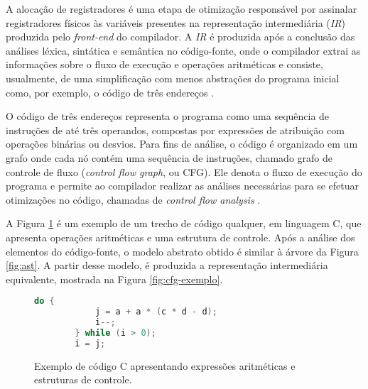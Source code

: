 \documentclass[
	12pt,				%
	openright,			%
	oneside,			%
	a4paper,			%
	tccpreliminar,			%
	]{ABNT-DC-UEL}
\begin{document}
A alocação de registradores é uma etapa de otimização responsável por assinalar registradores físicos às variáveis presentes na representação intermediária (\textit{IR}) produzida pelo \textit{front-end} do compilador. A \textit{IR} é produzida após a conclusão das análises léxica, sintática e semântica no código-fonte, onde o compilador extrai as informações sobre o fluxo de execução e operações aritméticas e consiste, usualmente, de uma simplificação com menos abstrações do programa inicial como, por exemplo, o código de três endereços  \cite{aho:07}.

O código de três endereços representa o programa como uma sequência de instruções de até três operandos, compostas por expressões de atribuição com operações binárias ou desvios. Para fins de análise, o código é organizado em um grafo onde cada nó contém uma sequência de instruções, chamado grafo de controle de fluxo (\textit{control flow graph}, ou CFG). Ele denota o fluxo de execução do programa e permite ao compilador realizar as análises necessárias para se efetuar otimizações no código, chamadas de \textit{control flow analysis} \cite{allen:70}.

A Figura \ref{fig:codigo-exemplo} é um exemplo de um trecho de código qualquer, em linguagem C, que apresenta operações aritméticas e uma estrutura de controle. Após a análise dos elementos do código-fonte, o modelo abstrato obtido é similar à árvore da Figura \ref{fig:ast}. A partir desse modelo, é produzida a representação intermediária equivalente, mostrada na Figura \ref{fig:cfg-exemplo}.

\begin{figure}[ht]
    \centering
    \begin{lstlisting}[language=c, frame=single]
        do {
            j = a + a * (c * d - d);
            i--;
        } while (i > 0);
        i = j;
    \end{lstlisting}
    \caption{Exemplo de código C apresentando expressões aritméticas e estruturas de controle.}
    \label{fig:codigo-exemplo}
\end{figure}
\end{document}
